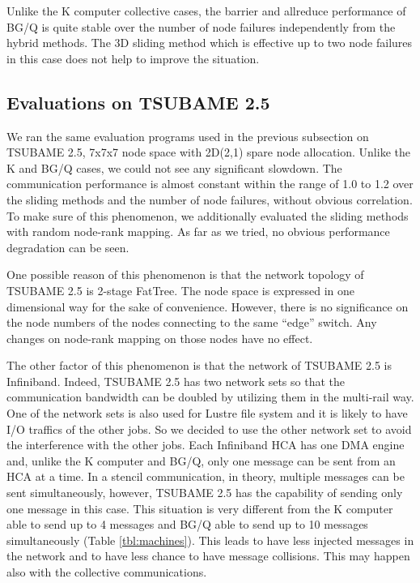 \documentclass[Afour,times,sageh]{sagej}
\begin{document}
Unlike the K computer collective cases, the barrier and allreduce
performance of BG/Q is quite stable over the number of node failures
independently from the hybrid methods. The 3D sliding method which is
effective up to two node failures in this case does not help to improve the
situation.

\subsection{Evaluations on TSUBAME 2.5}

We ran the same evaluation programs used in the previous subsection on
TSUBAME 2.5, 7x7x7 node space with 2D(2,1) spare node
allocation. Unlike the K and BG/Q cases,
we could not see any significant slowdown. The communication
performance is almost constant within the range of 1.0 to 1.2 over the
sliding methods and the number of node failures, without obvious
correlation. To make sure of this phenomenon, we additionally
evaluated the sliding methods with random node-rank mapping. As far as
we tried, no obvious performance degradation can be seen.

One possible reason of this phenomenon is that the network topology of
TSUBAME 2.5 is 2-stage FatTree. The node space is expressed in one
dimensional way for the sake of convenience. However, there is no
significance on the node numbers of the nodes connecting to the same
``edge'' switch. Any changes on node-rank mapping on those nodes have
no effect.

The other factor of this phenomenon is that the network of TSUBAME 2.5
is Infiniband. Indeed, TSUBAME 2.5 has two network sets so that the
communication bandwidth can be doubled by utilizing them in the
multi-rail way\citep{1392963}. One of the network sets is also used for
Lustre file system and it is likely to have I/O traffics of the other
jobs. So we decided to use the other network set to
avoid the interference with the other jobs. Each Infiniband HCA has
one DMA engine and, unlike the K computer and BG/Q, only one message
can be sent from an HCA at a time. In a stencil communication, in
theory, multiple messages can be sent simultaneously, however, TSUBAME
2.5 has the capability of sending only one message in this case. This
situation is very different from the K computer able to send up to 4
messages and BG/Q able to send up to 10 messages simultaneously (Table
\ref{tbl:machines}). This leads to have less injected messages in the
network and to have less chance to have message collisions. This may
happen also with the collective communications.
\end{document}
